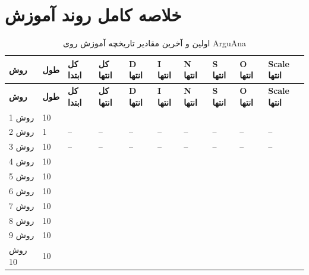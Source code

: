 \documentclass[a4paper,12pt]{article}
\begin{document}
\section{خلاصه کامل روند آموزش}

\begin{landscape}
\scriptsize
\begin{longtable}{|C{2.2cm}|C{1.2cm}|C{1.8cm}|C{1.8cm}|C{1.8cm}|C{1.8cm}|C{1.8cm}|C{1.8cm}|C{1.8cm}|C{2cm}|}
\caption{اولین و آخرین مقادیر تاریخچه آموزش روی ArguAna}\label{tab:arguana-training-full}\\
\hline
\textbf{روش} & \textbf{طول} & \textbf{کل ابتدا} & \textbf{کل انتها} & \textbf{D انتها} & \textbf{I انتها} & \textbf{N انتها} & \textbf{S انتها} & \textbf{O انتها} & \textbf{Scale انتها} \\
\hline
\endfirsthead
\hline
\textbf{روش} & \textbf{طول} & \textbf{کل ابتدا} & \textbf{کل انتها} & \textbf{D انتها} & \textbf{I انتها} & \textbf{N انتها} & \textbf{S انتها} & \textbf{O انتها} & \textbf{Scale انتها} \\
\hline
\endhead
روش 1 & 10 &  &  &  &  &  &  &  &  \\
\hline
روش 2 & 1 & -- & -- & -- & -- & -- & -- & -- & -- \\
\hline
روش 3 & 10 & -- & -- & -- & -- & -- & -- & -- & -- \\
\hline
روش 4 & 10 &  &  &  &  &  &  &  &  \\
\hline
روش 5 & 10 &  &  &  &  &  &  &  &  \\
\hline
روش 6 & 10 &  &  &  &  &  &  &  &  \\
\hline
روش 7 & 10 &  &  &  &  &  &  &  &  \\
\hline
روش 8 & 10 &  &  &  &  &  &  &  &  \\
\hline
روش 9 & 10 &  &  &  &  &  &  &  &  \\
\hline
روش 10 & 10 &  &  &  &  &  &  &  &  \\

\end{longtable}
\end{landscape}
\end{document}
